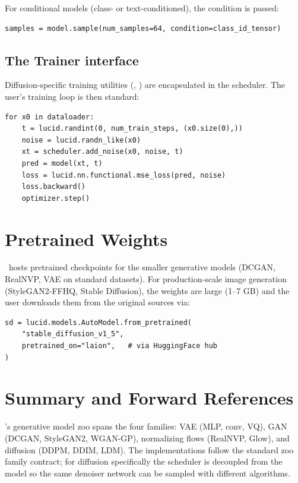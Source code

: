 For conditional models (class- or text-conditioned), the
condition is passed:

\begin{lstlisting}[style=lucid,language=LucidPython]
samples = model.sample(num_samples=64, condition=class_id_tensor)
\end{lstlisting}

\subsection{The Trainer interface}
\label{ssec:generative:trainer_iface}

Diffusion-specific training utilities (,
) are encapsulated in the scheduler. The user's
training loop is then standard:

\begin{lstlisting}[style=lucid,language=LucidPython]
for x0 in dataloader:
    t = lucid.randint(0, num_train_steps, (x0.size(0),))
    noise = lucid.randn_like(x0)
    xt = scheduler.add_noise(x0, noise, t)
    pred = model(xt, t)
    loss = lucid.nn.functional.mse_loss(pred, noise)
    loss.backward()
    optimizer.step()
\end{lstlisting}

\section{Pretrained Weights}
\label{sec:generative:pretrained}

\Lucid\ hosts pretrained checkpoints for the smaller generative
models (DCGAN, RealNVP, VAE on standard datasets). For
production-scale image generation (StyleGAN2-FFHQ, Stable
Diffusion), the weights are large (1--7 GB) and the user
downloads them from the original sources via:

\begin{lstlisting}[style=lucid,language=LucidPython]
sd = lucid.models.AutoModel.from_pretrained(
    "stable_diffusion_v1_5",
    pretrained_on="laion",   # via HuggingFace hub
)
\end{lstlisting}

\section{Summary and Forward References}
\label{sec:generative:summary}

\Lucid's generative model zoo spans the four families: VAE
(MLP, conv, VQ), GAN (DCGAN, StyleGAN2, WGAN-GP), normalizing
flows (RealNVP, Glow), and diffusion (DDPM, DDIM, LDM). The
implementations follow the standard zoo family contract; for
diffusion specifically the scheduler is decoupled from the
model so the same denoiser network can be sampled with different
algorithms.

